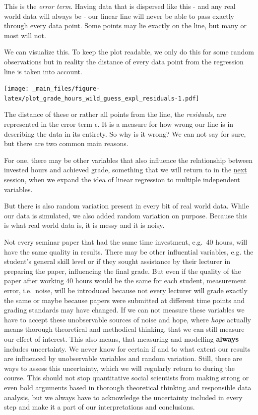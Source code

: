 \documentclass[
]{book}
\begin{document}
This is the \emph{error term}. Having data that is dispersed like this - and any real
world data will always be - our linear line will never be able to pass exactly
through every data point. Some points may lie exactly on the line, but many or
most will not.

We can visualize this. To keep the plot readable, we only do this for some
random observations but in reality the distance of every data point from the
regression line is taken into account.

\texttt{[image: \_main\_files/figure-latex/plot\_grade\_hours\_wild\_guess\_expl\_residuals-1.pdf]}

The distance of these or rather all points from the line, the \emph{residuals}, are
represented in the error term \(\epsilon\). It is a measure for how wrong our line
is in describing the data in its entirety. So why is it wrong? We can not say
for sure, but there are two common main reasons.

For one, there may be other variables that also influence the relationship
between invested hours and achieved grade, something that we will return to
in the \protect\hyperlink{lin-t-2}{next session}, when we expand the idea of linear regression to multiple
independent variables.

But there is also random variation present in every bit of real world data.
While our data is simulated, we also added random variation on purpose. Because
this is what real world data is, it is messy and it is noisy.

Not every seminar paper that had the same time investment, e.g.~40 hours, will
have the same quality in results. There may be other influential variables, e.g.
the student's general skill level or if they sought assistance by their lecturer
in preparing the paper, influencing the final grade. But even if the quality of
the paper after working 40 hours would be the same for each student, measurement
error, i.e.~noise, will be introduced because not every lecturer will grade
exactly the same or maybe because papers were submitted at different time
points and grading standards may have changed. If we can not measure these
variables we have to accept these unobservable sources of noise and hope, where
\emph{hope} actually means thorough theoretical and methodical thinking, that we can
still measure our effect of interest. This also means, that measuring and
modelling \textbf{always} includes uncertainty. We never know for certain if and to
what extent our results are influenced by unobservable variables and random
variation. Still, there are ways to assess this uncertainty, which we will
regularly return to during the course. This should not stop quantitative
social scientists from making strong or even bold arguments based in thorough
theoretical thinking and responsible data analysis, but we always have to
acknowledge the uncertainty included in every step and make it a part of our
interpretations and conclusions.
\end{document}
